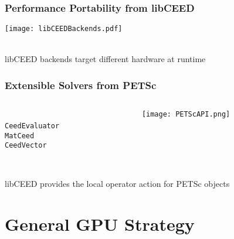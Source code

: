 \documentclass{beamer}
\begin{document}

\begin{frame}
\begin{center}
\frametitle{Performance Portability from libCEED}

\texttt{[image: libCEEDBackends.pdf]}

~\\

libCEED backends target different hardware at runtime\\

\end{center}
\end{frame}


\begin{frame}[fragile]
\begin{center}
\frametitle{Extensible Solvers from PETSc}

\begin{columns}
  \begin{column}{.25\textwidth}
    ~\\
    \lstinline{CeedEvaluator}\\
    \vspace{1.75cm}
    \lstinline{MatCeed}\\
    \vspace{0.75cm}
    \lstinline{CeedVector}\\
  \end{column}
  \begin{column}{.75\textwidth}
    \texttt{[image: PETScAPI.png]}
  \end{column}
\end{columns}

~\\

libCEED provides the local operator action for PETSc objects\\

\end{center}
\end{frame}

\section{General GPU Strategy}
\end{document}
